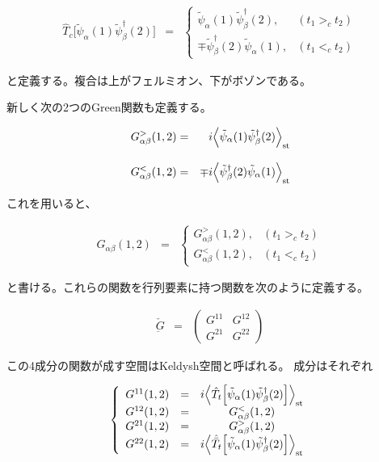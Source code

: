 \documentclass[uplatex,a4j,12pt,dvipdfmx]{jsarticle}
\begin{document}
\begin{eqnarray}
	\hat{T}_{c}
	\Big[ \tilde{\psi}_{\alpha}(1) \tilde{\psi}_{\beta}^{\dagger}(2) \Big]
	&=&
	\left\{
	\begin{array}{ll}
		\tilde{\psi}_{\alpha}(1) \tilde{\psi}_{\beta}^{\dagger}(2),     & (t_{1} >_{c} t_{2})
		\\[3mm]
		\mp \tilde{\psi}_{\beta}^{\dagger}(2) \tilde{\psi}_{\alpha}(1), & (t_{1} <_{c} t_{2})
	\end{array}
	\right.
\end{eqnarray}

と定義する。複合は上がフェルミオン、下がボゾンである。

新しく次の2つのGreen関数も定義する。

\begin{eqnarray}
	G^{>}_{\alpha \beta}(1,2)
	&=&
	i \Big\langle \tilde{\psi}_{\alpha}(1) \tilde{\psi}_{\beta}^{\dagger}(2) \Big\rangle_{\rm st}
	\\[3mm]
	G^{<}_{\alpha \beta}(1,2)
	&=&
	\mp i \Big\langle \tilde{\psi}_{\beta}^{\dagger}(2) \tilde{\psi}_{\alpha}(1) \Big\rangle_{\rm st}
\end{eqnarray}

これを用いると、

\begin{eqnarray}
	G_{\alpha \beta}(1,2)
	&=&
	\left\{
	\begin{array}{ll}
		G^{>}_{\alpha \beta}(1,2), & (t_{1} >_{c} t_{2})
		\\[3mm]
		G^{<}_{\alpha \beta}(1,2), & (t_{1} <_{c} t_{2})
	\end{array}
	\right.
\end{eqnarray}

と書ける。これらの関数を行列要素に持つ関数を次のように定義する。

\begin{eqnarray}
	\check{\underbar{G}}
	&=&
	\left(
	\begin{array}{ll}
			G^{11} & G^{12}
			\\
			G^{21} & G^{22}
		\end{array}
	\right)
\end{eqnarray}

この4成分の関数が成す空間はKeldysh空間と呼ばれる。
成分はそれぞれ

\begin{eqnarray}
	\left\{
	\begin{array}{llc}
		G^{11}(1,2) & = & i \Big\langle \hat{T}_{t} \Big[ \tilde{\psi}_{\alpha}(1) \tilde{\psi}_{\beta}^{\dagger}(2) \Big] \Big\rangle_{\rm st}
		\\
		G^{12}(1,2) & = & G^{<}_{\alpha \beta}(1,2)
		\\
		G^{21}(1,2) & = & G^{>}_{\alpha \beta}(1,2)
		\\
		G^{22}(1,2) & = & i \Big\langle \hat{\bar{T}}_{t} \Big[ \tilde{\psi}_{\alpha}(1) \tilde{\psi}_{\beta}^{\dagger}(2) \Big] \Big\rangle_{\rm st}
	\end{array}
	\right.
\end{eqnarray}
\end{document}
